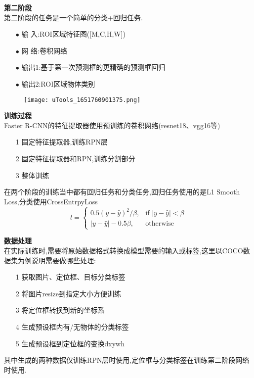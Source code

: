\begin{frame}
    \vspace{0.5em}
    \noindent\large\textbf{第二阶段}\\
    \vspace{0.5em}
    第二阶段的任务是一个简单的分类+回归任务.
    \begin{itemize}
        \item[$ \bullet $]输 入:ROI区域特征图([M,C,H,W])
        \item[$ \bullet $]网 络:卷积网络
        \item[$ \bullet $]输出1:基于第一次预测框的更精确的预测框回归
        \item[$ \bullet $]输出2:ROI区域物体类别
    \end{itemize}
    \begin{figure}
        \texttt{[image: uTools\_1651760901375.png]}
    \end{figure}
\end{frame}

\begin{frame}
    \vspace{0.5em}
    \noindent\large\textbf{训练过程}\\
    \vspace{0.5em}
    Faster R-CNN的特征提取器使用预训练的卷积网络(resnet18、vgg16等)
    \begin{itemize}
        \item[1]固定特征提取器,训练RPN层
        \item[2]固定特征提取器和RPN,训练分割部分
        \item[3]整体训练
    \end{itemize}
    在两个阶段的训练当中都有回归任务和分类任务,回归任务使用的是L1 Smooth Loss,分类使用CrossEntrpyLoss
    $$
        l = \begin{cases}
            0.5 (y - \hat{y})^2 / \beta, & \text{if } |y - \hat{y}| < \beta \\
            |y - \hat{y}| - 0.5 \beta,   & \text{otherwise }
        \end{cases}
    $$


\end{frame}

\begin{frame}
    \vspace{0.5em}
    \noindent\large\textbf{数据处理}\\
    \vspace{0.5em}
    在实际训练时,需要将原始数据格式转换成模型需要的输入或标签,这里以COCO数据集为例说明需要做哪些处理:
    \begin{itemize}
        \item[1]获取图片、定位框、目标分类标签
        \item[2]将图片resize到指定大小方便训练
        \item[3]将定位框转换到新的坐标系
        \item[4]生成预设框内有/无物体的分类标签
        \item[5]生成预设框到定位框的变换dxywh
    \end{itemize}
    其中生成的两种数据仅训练RPN层时使用,定位框与分类标签在训练第二阶段网络时使用.
\end{frame}

